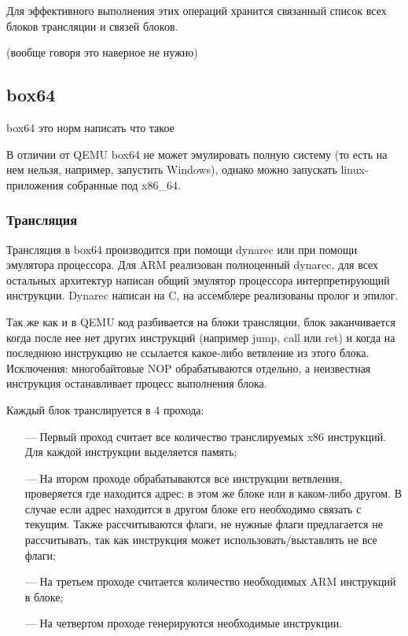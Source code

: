 Для эффективного выполнения этих операций хранится связанный список всех блоков трансляции и связей блоков.

(вообще говоря это наверное не нужно)


\subsection{box64}

box64 это норм написать что такое

В отличии от QEMU box64 не может эмулировать полную систему (то есть на нем нельзя, например, запустить Windows), однако можно запускать linux-приложения собранные под x86\_64.

\subsubsection{Трансляция}

Трансляция в box64 производится при помощи dynarec или при помощи эмулятора процессора. Для ARM реализован полноценный dynarec, для всех остальных архитектур написан общий эмулятор процессора интерпретирующий инструкции. Dynarec написан на C, на ассемблере реализованы пролог и эпилог.

Так же как и в QEMU код разбивается на блоки трансляции, блок заканчивается когда после нее нет других инструкций (например jump, call или ret) и когда на последнюю инструкцию не ссылается какое-либо ветвление из этого блока. Исключения: многобайтовые NOP обрабатываются отдельно, а неизвестная инструкция останавливает процесс выполнения блока.

Каждый блок транслируется в 4 прохода:
\begin{itemize}[leftmargin=1.6\parindent]
	\item[---] Первый проход считает все количество транслируемых x86 инструкций. Для каждой инструкции выделяется память;
	\item[---] На втором проходе обрабатываются все инструкции ветвления, проверяется где находится адрес: в этом же блоке или в каком-либо другом. В случае если адрес находится в другом блоке его необходимо связать с текущим. Также рассчитываются флаги, не нужные флаги предлагается не рассчитывать, так как инструкция может использовать/выставлять не все флаги;
	\item[---] На третьем проходе считается количество необходимых ARM инструкций в блоке;
	\item[---] На четвертом проходе генерируются необходимые инструкции.
\end{itemize}


